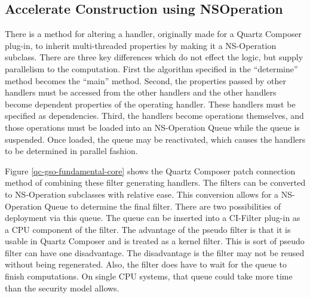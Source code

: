 \documentclass[11pt]{article}
\begin{document}
\subsection{Accelerate Construction using NSOperation}\label{nsoperation-for-cifilter-generator}
There is a method for altering a handler, originally made for a Quartz Composer plug-in, to inherit multi-threaded properties by making it a NS-Operation subclass. %
There are three key differences which do not effect the logic, but supply parallelism to the computation.  First the algorithm specified in the ``determine'' method becomes the ``main'' method.  Second, the properties passed by other handlers must be accessed from the other handlers and the other handlers become dependent properties of the operating handler.  These handlers must be specified as dependencies.  Third, the handlers become operations themselves, and those operations must be loaded into an NS-Operation Queue while the queue is suspended.   Once loaded, the queue may be reactivated, which causes the handlers to be determined in parallel fashion.  








Figure  \ref{qc-gso-fundamental-core} shows the Quartz Composer patch connection method of combining these filter generating handlers.  The filters can be converted to NS-Operation subclasses with relative ease.  This conversion allows for a NS-Operation Queue to determine the final filter.  There are two possibilities of deployment via this queue.  The queue can be inserted into a CI-Filter plug-in as a CPU component of the filter.    The advantage of the pseudo filter is that it is usable in Quartz Composer and is treated as a kernel filter. This is sort of  pseudo filter can have one disadvantage.  The disadvantage is the filter may not be reused without being regenerated.  Also, the filter does have to wait for the queue to finish computations.  On single CPU systems, that queue could take more time than the security model allows.   
\end{document}
